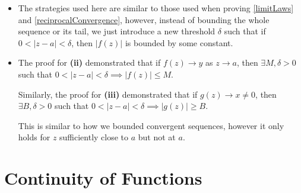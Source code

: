 \documentclass[../main.tex]{subfiles}
\begin{document}
\begin{remark}
  \begin{itemize}
    \item The strategies used here are similar to those used when proving \cref{limitLaws} and \cref{reciprocalConvergence}, however, instead of bounding the whole sequence or its tail, we just introduce a new threshold $\delta$ such that if $0 < |z - a| < \delta$, then $|f(z)|$ is bounded by some constant.
    \item The proof for \textbf{(ii)} demonstrated that if $f(z) \to y$ as $z \to a$, then $\exists M, \delta > 0$ such that $0 < |z - a| < \delta \implies |f(z)| \leq M$.

      Similarly, the proof for \textbf{(iii)} demonstrated that if $g(z) \to x \neq 0$, then $\exists B, \delta > 0$ such that $0 < |z - a| < \delta \implies |g(z)| \geq B$.

      This is similar to how we bounded convergent sequences, however it only holds for $z$ sufficiently close to $a$ but not at $a$.
  \end{itemize}
\end{remark}
\section{Continuity of Functions}
\end{document}
